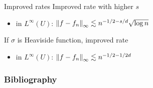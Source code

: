 \documentclass[aspectratio=32]{beamer}
\begin{document}
\begin{frame}{Improved rates}
    Improved rate with higher $s$
    \begin{itemize}
        \item in $L^{\infty}(U)$: $\left\| f - f_n \right\|_{\infty} \lesssim n^{-1/2-s/d} \sqrt{\log{n}} $
    \end{itemize}
    If $\sigma$ is Heaviside function, improved rate
    \begin{itemize}
        \item in $L^{\infty}(U)$: $\left\| f - f_n \right\|_{\infty} \lesssim n^{-1/2 - 1/2d}$
    \end{itemize}
\end{frame}

\begin{frame}[t,allowframebreaks]
    \frametitle{Bibliography}
    
\end{frame}
\end{document}
